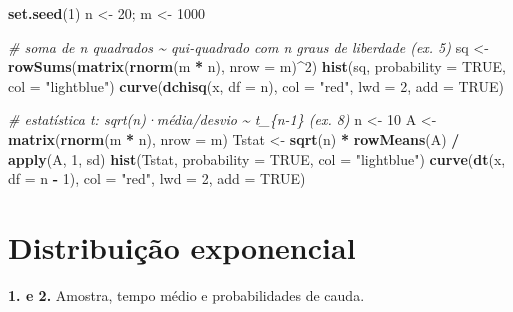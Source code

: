 \documentclass[
  portuguese,
  11pt,
  openany]{book}
\newenvironment{Shaded}{\begin{snugshade}}{\end{snugshade}}
\newcommand{\AttributeTok}[1]{\textcolor[rgb]{0.13,0.29,0.53}{#1}}
\newcommand{\CommentTok}[1]{\textcolor[rgb]{0.56,0.35,0.01}{\textit{#1}}}
\newcommand{\ConstantTok}[1]{\textcolor[rgb]{0.56,0.35,0.01}{#1}}
\newcommand{\DecValTok}[1]{\textcolor[rgb]{0.00,0.00,0.81}{#1}}
\newcommand{\FunctionTok}[1]{\textcolor[rgb]{0.13,0.29,0.53}{\textbf{#1}}}
\newcommand{\NormalTok}[1]{#1}
\newcommand{\OtherTok}[1]{\textcolor[rgb]{0.56,0.35,0.01}{#1}}
\newcommand{\SpecialCharTok}[1]{\textcolor[rgb]{0.81,0.36,0.00}{\textbf{#1}}}
\newcommand{\StringTok}[1]{\textcolor[rgb]{0.31,0.60,0.02}{#1}}
\begin{document}
\begin{Shaded}
\begin{Highlighting}[]
\FunctionTok{set.seed}\NormalTok{(}\DecValTok{1}\NormalTok{)}
\NormalTok{n }\OtherTok{\textless{}{-}} \DecValTok{20}\NormalTok{; m }\OtherTok{\textless{}{-}} \DecValTok{1000}

\CommentTok{\# soma de n quadrados \textasciitilde{} qui{-}quadrado com n graus de liberdade (ex. 5)}
\NormalTok{sq }\OtherTok{\textless{}{-}} \FunctionTok{rowSums}\NormalTok{(}\FunctionTok{matrix}\NormalTok{(}\FunctionTok{rnorm}\NormalTok{(m }\SpecialCharTok{*}\NormalTok{ n), }\AttributeTok{nrow =}\NormalTok{ m)}\SpecialCharTok{\^{}}\DecValTok{2}\NormalTok{)}
\FunctionTok{hist}\NormalTok{(sq, }\AttributeTok{probability =} \ConstantTok{TRUE}\NormalTok{, }\AttributeTok{col =} \StringTok{"lightblue"}\NormalTok{)}
\FunctionTok{curve}\NormalTok{(}\FunctionTok{dchisq}\NormalTok{(x, }\AttributeTok{df =}\NormalTok{ n), }\AttributeTok{col =} \StringTok{"red"}\NormalTok{, }\AttributeTok{lwd =} \DecValTok{2}\NormalTok{, }\AttributeTok{add =} \ConstantTok{TRUE}\NormalTok{)}

\CommentTok{\# estatística t: sqrt(n)·média/desvio \textasciitilde{} t\_\{n{-}1\} (ex. 8)}
\NormalTok{n }\OtherTok{\textless{}{-}} \DecValTok{10}
\NormalTok{A }\OtherTok{\textless{}{-}} \FunctionTok{matrix}\NormalTok{(}\FunctionTok{rnorm}\NormalTok{(m }\SpecialCharTok{*}\NormalTok{ n), }\AttributeTok{nrow =}\NormalTok{ m)}
\NormalTok{Tstat }\OtherTok{\textless{}{-}} \FunctionTok{sqrt}\NormalTok{(n) }\SpecialCharTok{*} \FunctionTok{rowMeans}\NormalTok{(A) }\SpecialCharTok{/} \FunctionTok{apply}\NormalTok{(A, }\DecValTok{1}\NormalTok{, sd)}
\FunctionTok{hist}\NormalTok{(Tstat, }\AttributeTok{probability =} \ConstantTok{TRUE}\NormalTok{, }\AttributeTok{col =} \StringTok{"lightblue"}\NormalTok{)}
\FunctionTok{curve}\NormalTok{(}\FunctionTok{dt}\NormalTok{(x, }\AttributeTok{df =}\NormalTok{ n }\SpecialCharTok{{-}} \DecValTok{1}\NormalTok{), }\AttributeTok{col =} \StringTok{"red"}\NormalTok{, }\AttributeTok{lwd =} \DecValTok{2}\NormalTok{, }\AttributeTok{add =} \ConstantTok{TRUE}\NormalTok{)}
\end{Highlighting}
\end{Shaded}

\section{Distribuição exponencial}\label{distribuiuxe7uxe3o-exponencial-1}

\textbf{1. e 2.} Amostra, tempo médio e probabilidades de cauda.
\end{document}

